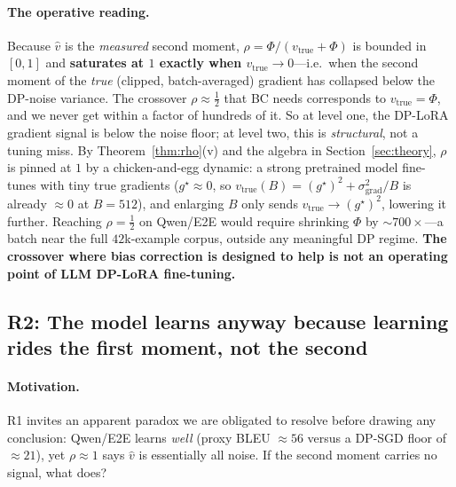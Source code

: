 \documentclass[11pt]{article}
\theoremstyle{plain}
\theoremstyle{definition}
\theoremstyle{remark}
\begin{document}
\paragraph{The operative reading.}
Because $\hat v$ is the \emph{measured} second moment, $\rho = \Phi/(v_{\mathrm{true}}+\Phi)$ is bounded
in $[0,1]$ and \textbf{saturates at $1$ exactly when $v_{\mathrm{true}}\to 0$}---i.e.\ when the
second moment of the \emph{true} (clipped, batch-averaged) gradient has collapsed below the DP-noise
variance. The crossover $\rho\approx\tfrac12$ that BC needs corresponds to $v_{\mathrm{true}}=\Phi$,
and we never get within a factor of hundreds of it. So at level one, the DP-LoRA gradient signal is
below the noise floor; at level two, this is \emph{structural}, not a tuning miss. By
Theorem~\ref{thm:rho}(v) and the algebra in Section~\ref{sec:theory}, $\rho$ is pinned at $1$ by a
chicken-and-egg dynamic: a strong pretrained model fine-tunes with tiny true gradients
($g^\star\!\approx\!0$, so $v_{\mathrm{true}}(B)=(g^\star)^2+\sigma^2_{\mathrm{grad}}/B$ is already
$\approx0$ at $B{=}512$), and enlarging $B$ only sends $v_{\mathrm{true}}\to(g^\star)^2$, lowering it
further. Reaching $\rho=\tfrac12$ on Qwen/E2E would require shrinking $\Phi$ by $\sim700\times$---a
batch near the full $42$k-example corpus, outside any meaningful DP regime. \textbf{The crossover
where bias correction is designed to help is not an operating point of LLM DP-LoRA fine-tuning.}

\subsection{R2: The model learns anyway because learning rides the first moment, not the second}
\label{sec:r2}

\paragraph{Motivation.}
R1 invites an apparent paradox we are obligated to resolve before drawing any conclusion: Qwen/E2E
learns \emph{well} (proxy BLEU $\approx56$ versus a DP-SGD floor of $\approx21$), yet $\rho\approx1$
says $\hat v$ is essentially all noise. If the second moment carries no signal, what does?
\end{document}
